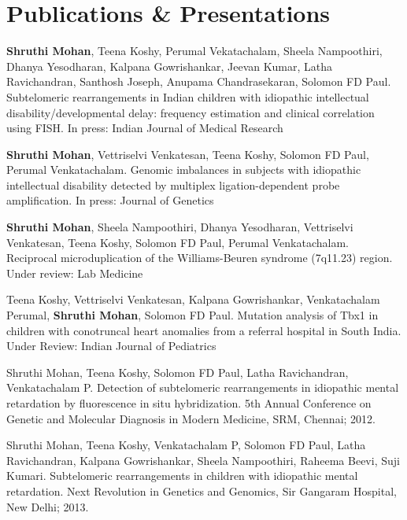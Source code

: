 
\chapter{Publications \& Presentations} %

\label{Appendix1} %

\textbf{Shruthi Mohan}, Teena Koshy, Perumal Vekatachalam, Sheela Nampoothiri, Dhanya Yesodharan, Kalpana Gowrishankar, Jeevan Kumar, Latha Ravichandran, Santhosh Joseph, Anupama Chandrasekaran, Solomon FD Paul. Subtelomeric rearrangements in Indian children with idiopathic intellectual disability/developmental delay: frequency estimation and clinical correlation using FISH.
In press: Indian Journal of Medical Research 

\textbf{Shruthi Mohan}, Vettriselvi Venkatesan, Teena Koshy, Solomon FD Paul, Perumal Venkatachalam. Genomic imbalances in subjects with idiopathic intellectual disability detected by multiplex ligation-dependent probe amplification.
In press: Journal of Genetics

\textbf{Shruthi Mohan}, Sheela Nampoothiri, Dhanya Yesodharan, Vettriselvi Venkatesan, Teena Koshy, Solomon FD Paul, Perumal Venkatachalam. Reciprocal microduplication of the Williams-Beuren syndrome (7q11.23) region. 
Under review: Lab Medicine

Teena Koshy, Vettriselvi Venkatesan, Kalpana Gowrishankar, Venkatachalam Perumal, \textbf{Shruthi Mohan}, Solomon FD Paul. Mutation analysis of Tbx1 in children with conotruncal heart anomalies from a referral hospital in South India. 
Under Review: Indian Journal of Pediatrics

Shruthi Mohan, Teena Koshy, Solomon FD Paul, Latha Ravichandran, Venkatachalam P. Detection of subtelomeric rearrangements in idiopathic mental retardation by fluorescence in situ hybridization. 5th Annual Conference on Genetic and Molecular Diagnosis in Modern Medicine, SRM, Chennai; 2012.

Shruthi Mohan, Teena Koshy, Venkatachalam P, Solomon FD Paul, Latha Ravichandran, Kalpana Gowrishankar, Sheela Nampoothiri, Raheema Beevi, Suji Kumari. Subtelomeric rearrangements in children with idiopathic mental retardation. Next Revolution in Genetics and Genomics, Sir Gangaram Hospital, New Delhi; 2013.

